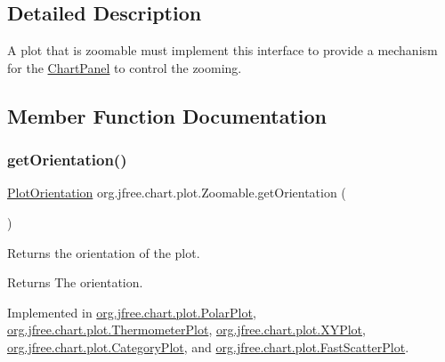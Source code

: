 \subsection{Detailed Description}
A plot that is zoomable must implement this interface to provide a mechanism for the \mbox{\hyperlink{classorg_1_1jfree_1_1chart_1_1_chart_panel}{Chart\+Panel}} to control the zooming. 

\subsection{Member Function Documentation}
\mbox{\label{interfaceorg_1_1jfree_1_1chart_1_1plot_1_1_zoomable_a293ef8fc796608bde4d44dfbac8dfdda}} 
\subsubsection{\texorpdfstring{get\+Orientation()}{getOrientation()}}
{\footnotesize\ttfamily \mbox{\hyperlink{classorg_1_1jfree_1_1chart_1_1plot_1_1_plot_orientation}{Plot\+Orientation}} org.\+jfree.\+chart.\+plot.\+Zoomable.\+get\+Orientation (\begin{DoxyParamCaption}{ }\end{DoxyParamCaption})}

Returns the orientation of the plot.

\begin{DoxyReturn}{Returns}
The orientation. 
\end{DoxyReturn}


Implemented in \mbox{\hyperlink{classorg_1_1jfree_1_1chart_1_1plot_1_1_polar_plot_a07f4e721ab3798eef43b7401d54808f7}{org.\+jfree.\+chart.\+plot.\+Polar\+Plot}}, \mbox{\hyperlink{classorg_1_1jfree_1_1chart_1_1plot_1_1_thermometer_plot_a12bb9968d853a440fd272506f58d83db}{org.\+jfree.\+chart.\+plot.\+Thermometer\+Plot}}, \mbox{\hyperlink{classorg_1_1jfree_1_1chart_1_1plot_1_1_x_y_plot_a5b0c5d43d190ffdfc7cdee341c0e6990}{org.\+jfree.\+chart.\+plot.\+X\+Y\+Plot}}, \mbox{\hyperlink{classorg_1_1jfree_1_1chart_1_1plot_1_1_category_plot_ab765cf8f5fe1dcf554b1a223bbe2d158}{org.\+jfree.\+chart.\+plot.\+Category\+Plot}}, and \mbox{\hyperlink{classorg_1_1jfree_1_1chart_1_1plot_1_1_fast_scatter_plot_af6a4373b3880bdd8c8e20d009c21c0fc}{org.\+jfree.\+chart.\+plot.\+Fast\+Scatter\+Plot}}.

